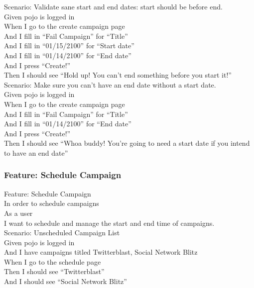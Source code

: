 \documentclass[12pt]{article}
\begin{document}
Scenario: Validate sane start and end dates: start should be before end. \\
Given pojo is logged in \\
When I go to the create campaign page \\
And I fill in ``Fail Campaign'' for ``Title'' \\
And I fill in ``01/15/2100'' for ``Start date'' \\
And I fill in ``01/14/2100'' for ``End date'' \\
And I press ``Create!'' \\
Then I should see ``Hold up! You can't end something before you start it!'' \\

Scenario: Make sure you can't have an end date without a start date. \\
Given pojo is logged in \\
When I go to the create campaign page \\
And I fill in ``Fail Campaign'' for ``Title'' \\
And I fill in ``01/14/2100'' for ``End date'' \\
And I press ``Create!'' \\
Then I should see ``Whoa buddy! You're going to need a start date if you intend to have an end date'' \\

\subsubsection{Feature: Schedule Campaign}

Feature: Schedule Campaign \\
In order to schedule campaigns \\
As a user \\
I want to schedule and manage the start and end time of campaigns. \\

Scenario: Unscheduled Campaign List \\
Given pojo is logged in \\
And I have campaigns titled Twitterblast, Social Network Blitz \\
When I go to the schedule page \\
Then I should see ``Twitterblast'' \\
And I should see ``Social Network Blitz'' \\
\end{document}
